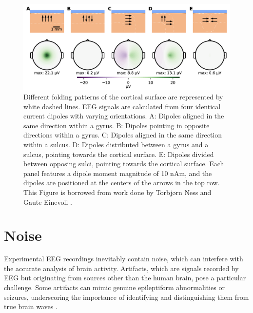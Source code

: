 \documentclass[a4paper, UKenglish, 11pt]{uiomaster}
\begin{document}
\begin{figure}[!htb]
    \centering
    \includegraphics[width=\linewidth]{figures/dipole_orientation.png}
    \caption{Different folding patterns of the cortical surface are represented by white dashed lines. EEG signals are calculated from four identical current dipoles with varying orientations. A: Dipoles aligned in the same direction within a gyrus. B: Dipoles pointing in opposite directions within a gyrus. C: Dipoles aligned in the same direction within a sulcus. D: Dipoles distributed between a gyrus and a sulcus, pointing towards the cortical surface. E: Dipoles divided between opposing sulci, pointing towards the cortical surface.
    Each panel features a dipole moment magnitude of 10 nAm, and the dipoles are positioned at the centers of the arrows in the top row. This Figure is borrowed from work done by Torbjørn Ness and Gaute Einevoll \cite{naess2021biophysically}.}
    \label{fig:dipole_orientation}
\end{figure}




\section{Noise}
Experimental EEG recordings inevitably contain noise, which can interfere with the accurate analysis of brain activity. Artifacts, which are signals recorded by EEG but originating from sources other than the human brain, pose a particular challenge. Some artifacts can mimic genuine epileptiform abnormalities or seizures, underscoring the importance of identifying and distinguishing them from true brain waves \cite{sazgar2019eeg}.
\end{document}
